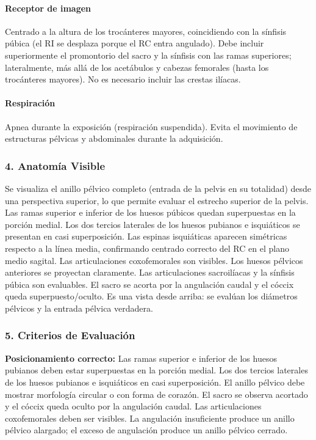 		\paragraph{Receptor de imagen}
		Centrado a la altura de los trocánteres mayores, coincidiendo con la sínfisis púbica (el RI se desplaza porque el RC entra angulado). Debe incluir superiormente el promontorio del sacro y la sínfisis con las ramas superiores; lateralmente, más allá de los acetábulos y cabezas femorales (hasta los trocánteres mayores). No es necesario incluir las crestas ilíacas.
		
		\paragraph{Respiración}
		Apnea durante la exposición (respiración suspendida). Evita el movimiento de estructuras pélvicas y abdominales durante la adquisición.
		
		\subsubsection*{4. Anatomía Visible}
		
		Se visualiza el anillo pélvico completo (entrada de la pelvis en su totalidad) desde una perspectiva superior, lo que permite evaluar el estrecho superior de la pelvis. Las ramas superior e inferior de los huesos púbicos quedan superpuestas en la porción medial. Los dos tercios laterales de los huesos pubianos e isquiáticos se presentan en casi superposición. Las espinas isquiáticas aparecen simétricas respecto a la línea media, confirmando centrado correcto del RC en el plano medio sagital. Las articulaciones coxofemorales son visibles. Los huesos pélvicos anteriores se proyectan claramente. Las articulaciones sacroilíacas y la sínfisis púbica son evaluables. El sacro se acorta por la angulación caudal y el cóccix queda superpuesto/oculto. Es una vista desde arriba: se evalúan los diámetros pélvicos y la entrada pélvica verdadera.
		
		\subsubsection*{5. Criterios de Evaluación}
		
		\textbf{Posicionamiento correcto:} Las ramas superior e inferior de los huesos pubianos deben estar superpuestas en la porción medial. Los dos tercios laterales de los huesos pubianos e isquiáticos en casi superposición. El anillo pélvico debe mostrar morfología circular o con forma de corazón. El sacro se observa acortado y el cóccix queda oculto por la angulación caudal. Las articulaciones coxofemorales deben ser visibles. La angulación insuficiente produce un anillo pélvico alargado; el exceso de angulación produce un anillo pélvico cerrado.
		
